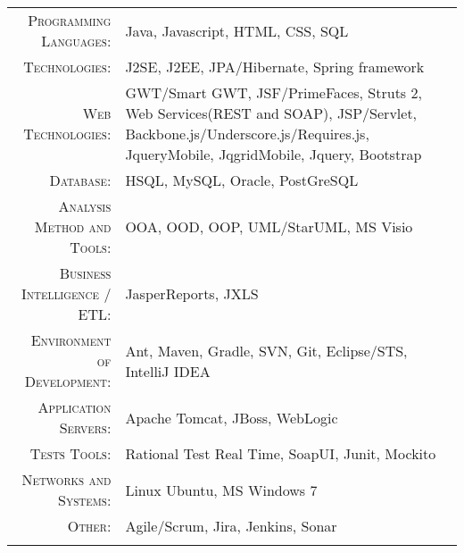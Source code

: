 %
%
%

\renewcommand{\arraystretch}{1.1}

	\begin{tabular}{>{}r>{}p{13cm}} 
\textsc{Programming Languages:}  	 &   Java,  Javascript, HTML, CSS, SQL\\ 
\textsc{Technologies:}  		&   J2SE, J2EE,  JPA/Hibernate, Spring framework\\ 
\textsc{Web Technologies:}  		 &   GWT/Smart GWT,  JSF/PrimeFaces, Struts 2, Web Services(REST and SOAP), JSP/Servlet, Backbone.js/Underscore.js/Requires.js, JqueryMobile, JqgridMobile, Jquery, Bootstrap\\ 
\textsc{Database:}  		&   HSQL,  MySQL, Oracle, PostGreSQL\\ 
\textsc{Analysis Method and Tools:}  		&   OOA,  OOD, OOP, UML/StarUML, MS Visio\\ 
\textsc{Business Intelligence / ETL:}               	&   JasperReports, JXLS\\ 
\textsc{Environment of Development:}                  &   Ant, Maven, Gradle, SVN, Git, Eclipse/STS, IntelliJ IDEA\\ 
\textsc{Application Servers:}	  		&   Apache Tomcat, JBoss, WebLogic\\
\textsc{Tests Tools:}	  		&   Rational Test Real Time, SoapUI, Junit, Mockito\\
\textsc{Networks and Systems:}	  		&   Linux Ubuntu, MS Windows 7\\
\textsc{Other:}	  		&   Agile/Scrum, Jira, Jenkins, Sonar\\
\newline
    \end{tabular}
    